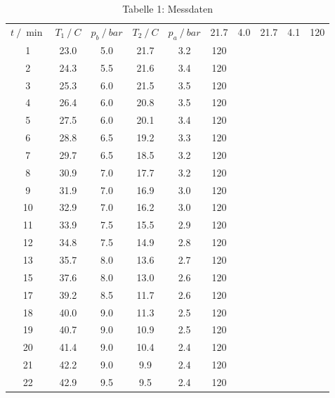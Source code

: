     \begin{table}
        \centering
        \caption{Tabelle 1: Messdaten}
        \label{tab:Messdaten}
        \begin{tabular}{S[table-format = 2.0] S[table-format = 2.1] S[table-format = 2.2] S[table-format = 2.1] S[table-format = 1.1] S[table-format = 3.0]}
            \toprule
            {$t \mathbin{/} \si{\min}$} 
            & {$T_1 \mathbin{/} C$} & {$p_b \mathbin{/} bar$} 
            & {$T_2 \mathbin{/} C$} & {$p_a \mathbin{/} bar$}
             &    21.7 &	 4.0  &	21.7 &  4.1  &  120 \\
             1 &    23.0 &	 5.0  &	21.7 &	3.2	 &  120 \\
             2 &	24.3 &	 5.5  &	21.6 &	3.4	 &  120 \\
             3 &	25.3 &   6.0  &	21.5 &	3.5	 &  120 \\
             4 &	26.4 & 	 6.0  &	20.8 &	3.5	 &  120 \\
             5 &	27.5 &	 6.0  &	20.1 &	3.4	 &  120 \\
             6 &	28.8 &	 6.5  &	19.2 &	3.3  &	120 \\
             7 &	29.7 &	 6.5  &	18.5 &	3.2	 &  120 \\
             8 &	30.9 &	 7.0  &	17.7 &	3.2	 &  120 \\
             9 &	31.9 &	 7.0  &	16.9 &	3.0	 &  120 \\
            10 &	32.9 &   7.0  &	16.2 &	3.0	 &  120 \\
            11 &	33.9 &	 7.5  &	15.5 &	2.9  &	120 \\
            12 &	34.8 &	 7.5  &	14.9 &	2.8	 &  120 \\
            13 &	35.7 &	 8.0  &	13.6 &	2.7  &	120 \\
            15 &	37.6 &	 8.0  &	13.0 & 	2.6	 &  120 \\
            17 &	39.2 &	 8.5  &	11.7 &	2.6	 &  120 \\
            18 &	40.0 &	 9.0  &	11.3 &	2.5	 &  120 \\
            19 &	40.7 &	 9.0  &	10.9 &	2.5  &	120 \\
            20 &	41.4 &	 9.0  &	10.4 &	2.4  &	120 \\
            21 & 	42.2 &	 9.0  &	 9.9 &  2.4  & 	120 \\
            22 &	42.9 &	 9.5  &	 9.5 &  2.4	 &  120 \\

\end{tabular}
\end{table}
